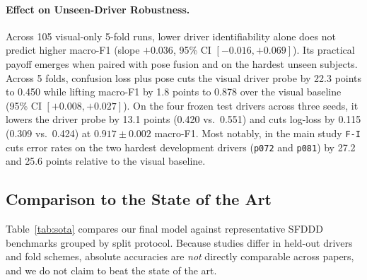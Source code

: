 \paragraph{Effect on Unseen-Driver Robustness.}
Across 105 visual-only 5-fold runs, lower driver identifiability alone does
not predict higher macro-F1 (slope $+0.036$, 95\% CI $[-0.016, +0.069]$). Its
practical payoff emerges when paired with pose fusion and on the hardest
unseen subjects. Across 5 folds, confusion loss plus pose cuts the visual
driver probe by 22.3 points to 0.450 while lifting macro-F1 by 1.8 points to
0.878 over the visual baseline (95\% CI $[+0.008, +0.027]$). On the four
frozen test drivers across three seeds, it lowers the driver probe by 13.1
points (0.420 vs.\ 0.551) and cuts log-loss by 0.115 (0.309 vs.\ 0.424) at
$0.917 \pm 0.002$ macro-F1. Most notably, in the main study \texttt{F-I} cuts
error rates on the two hardest development drivers (\texttt{p072} and
\texttt{p081}) by 27.2 and 25.6 points relative to the visual
baseline.

\subsection{Comparison to the State of the Art}
\label{sec:sota}

Table~\ref{tab:sota} compares our final model against representative SFDDD
benchmarks grouped by split protocol. Because studies differ in held-out
drivers and fold schemes, absolute accuracies are \emph{not} directly
comparable across papers, and we do not claim to beat the state of the art.


